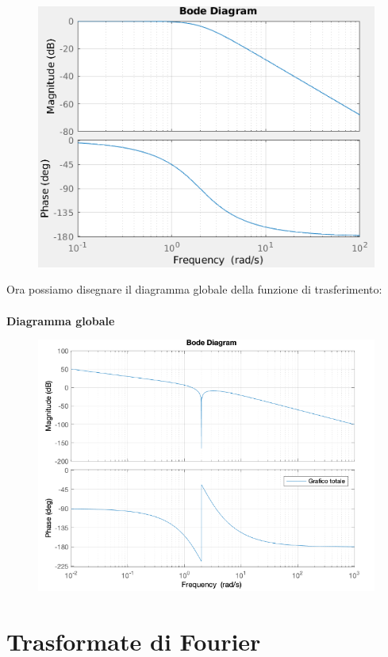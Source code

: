 \documentclass[12pt,a4paper]{article}
\begin{document}
\begin{itemize}
		\newpage
		\begin{figure}[h!]
			\centering
			\includegraphics[scale=0.5]{./images/bode46_5.png}
		\end{figure}
	\end{itemize}
	Ora possiamo disegnare il diagramma globale della funzione di trasferimento:\\\\
	\textbf{Diagramma globale}
	\begin{figure}[h!]
		\centering
		\includegraphics[scale=0.6]{./images/bode46tot.png}
	\end{figure}
	\newpage
	\section*{Trasformate di Fourier}
\end{document}
